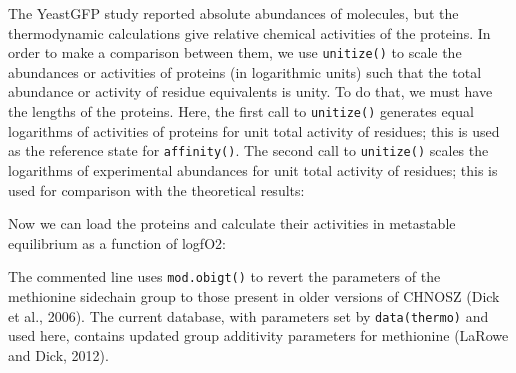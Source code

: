 \documentclass[]{tufte-handout}
\newenvironment{Shaded}{}{}
\newcommand{\KeywordTok}[1]{\textcolor[rgb]{0.00,0.44,0.13}{\textbf{#1}}}
\newcommand{\DecValTok}[1]{\textcolor[rgb]{0.25,0.63,0.44}{#1}}
\newcommand{\StringTok}[1]{\textcolor[rgb]{0.25,0.44,0.63}{#1}}
\newcommand{\OperatorTok}[1]{\textcolor[rgb]{0.40,0.40,0.40}{#1}}
\newcommand{\NormalTok}[1]{#1}
\begin{document}
\begin{Shaded}
\end{Shaded}

The YeastGFP study reported absolute abundances of molecules, but the
thermodynamic calculations give relative chemical activities of the
proteins. In order to make a comparison between them, we use
{\texttt{unitize()}} to scale the abundances or activities of proteins
(in logarithmic units) such that the total abundance or activity of
residue equivalents is unity. To do that, we must have the lengths of
the proteins. Here, the first call to {\texttt{unitize()}} generates
equal logarithms of activities of proteins for unit total activity of
residues; this is used as the reference state for {\texttt{affinity()}}.
The second call to {\texttt{unitize()}} scales the logarithms of
experimental abundances for unit total activity of residues; this is
used for comparison with the theoretical results:

\begin{Shaded}
\end{Shaded}

Now we can load the proteins and calculate their activities in
metastable equilibrium as a function of logfO2:

\begin{marginfigure}
The commented line uses {\texttt{mod.obigt()}} to revert the parameters
of the methionine sidechain group to those present in older versions of
CHNOSZ (Dick et al., 2006). The current database, with parameters set by
{\texttt{data(thermo)}} and used here, contains updated group additivity
parameters for methionine (LaRowe and Dick, 2012).
\end{marginfigure}
\end{document}
